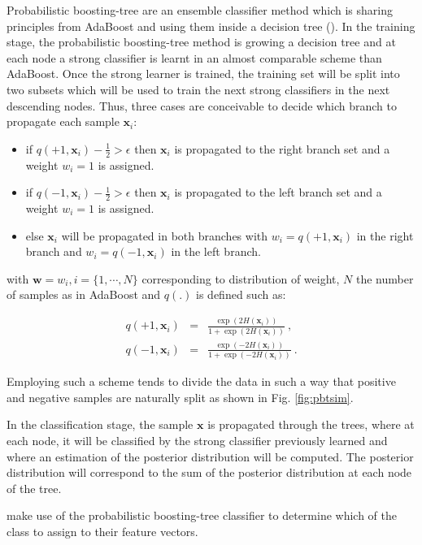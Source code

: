 \begin{enumerate}[leftmargin=*]
Probabilistic boosting-tree are an ensemble classifier method which is sharing principles from AdaBoost and using them inside a decision tree (\cite{Tu2005}). In the training stage, the probabilistic boosting-tree method is growing a decision tree and at each node a strong classifier is learnt in an almost comparable scheme than AdaBoost. Once the strong learner is trained, the training set will be split into two subsets which will be used to train the next strong classifiers in the next descending nodes. Thus, three cases are conceivable to decide which branch to propagate each sample $\mathbf{x}_i$:
\begin{itemize}
	\item if $q(+1, \mathbf{x}_i) - \frac{1}{2} > \epsilon$ then $\mathbf{x}_i$ is propagated to the right branch set and a weight $w_i=1$ is assigned. 
	\item if $q(-1, \mathbf{x}_i) - \frac{1}{2} > \epsilon$ then $\mathbf{x}_i$ is propagated to the left branch set and a weight $w_i=1$ is assigned.
	\item else $\mathbf{x}_i$ will be propagated in both branches with $w_i=q(+1, \mathbf{x}_i)$ in the right branch and $w_i=q(-1, \mathbf{x}_i)$ in the left branch.
\end{itemize}

\noindent with $\mathbf{w} = w_i, i=\{1,\cdots,N\}$ corresponding to distribution of weight, $N$ the number of samples as in AdaBoost and $q(.)$ is defined such as:

\begin{eqnarray}
	q(+1, \mathbf{x}_i) & = & \frac{\exp(2H(\mathbf{x}_i))}{1+\exp(2H(\mathbf{x}_i))} \ , \label{eq:regada1} \\
	q(-1, \mathbf{x}_i) & = & \frac{\exp(-2H(\mathbf{x}_i))}{1+\exp(-2H(\mathbf{x}_i))} \ . \label{eq:regada2}
\end{eqnarray}

Employing such a scheme tends to divide the data in such a way that positive and negative samples are naturally split as shown in Fig. \ref{fig:pbtsim}.

In the classification stage, the sample $\mathbf{x}$ is propagated through the trees, where at each node, it will be classified by the strong classifier previously learned and where an estimation of the posterior distribution will be computed. The posterior distribution will correspond to the sum of the posterior distribution at each node of the tree.

\cite{Tiwari2009a,Tiwari2012,Tiwari2010,Viswanath2011} make use of the probabilistic boosting-tree classifier to determine which of the class to assign to their feature vectors.


\end{enumerate}
